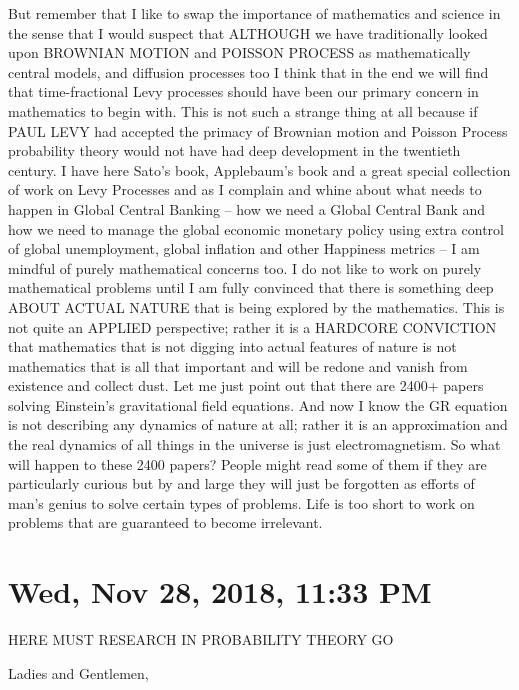 \documentclass{amsart}
\begin{document}
But remember that I like to swap the importance of mathematics and science in the sense that I would suspect that ALTHOUGH we have traditionally looked upon BROWNIAN MOTION and POISSON PROCESS as mathematically central models, and diffusion processes too I think that in the end we will find that time-fractional Levy processes should have been our primary concern in mathematics to begin with.  This is not such a strange thing at all because if PAUL LEVY had accepted the primacy of Brownian motion and Poisson Process probability theory would not have had deep development in the twentieth century.  I have here Sato's book, Applebaum's book and a great special collection of work on Levy Processes and as I complain and whine about what needs to happen in Global Central Banking -- how we need a Global Central Bank and how we need to manage the global economic monetary policy using extra control of global unemployment, global inflation and other Happiness metrics -- I am mindful of purely mathematical concerns too.  I do not like to work on purely mathematical problems until I am fully convinced that there is something deep ABOUT ACTUAL NATURE that is being explored by the mathematics.  This is not quite an APPLIED perspective; rather it is a HARDCORE CONVICTION that mathematics that is not digging into actual features of nature is not mathematics that is all that important and will be redone and vanish from existence and collect dust.  Let me just point out that there are 2400+ papers solving Einstein's gravitational field equations.  And now I know the GR equation is not describing any dynamics of nature at all; rather it is an approximation and the real dynamics of all things in the universe is just electromagnetism.  So what will happen to these 2400 papers?  People might read some of them if they are particularly curious but by and large they will just be forgotten as efforts of man's genius to solve certain types of problems.  Life is too short to work on problems that are guaranteed to become irrelevant.

\section{Wed, Nov 28, 2018, 11:33 PM}
HERE MUST RESEARCH IN PROBABILITY THEORY GO

Ladies and Gentlemen,
\end{document}
